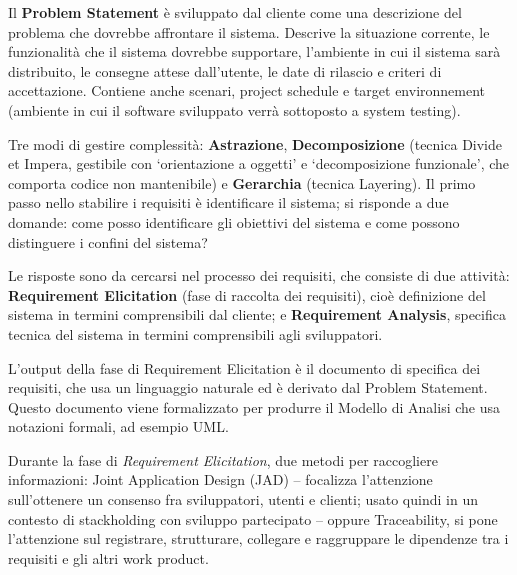 \documentclass{article}
\begin{document}
        Il \textbf{Problem Statement} è sviluppato dal cliente come una descrizione del problema che dovrebbe affrontare il sistema. Descrive la situazione corrente, le funzionalità che il sistema dovrebbe supportare, l’ambiente in cui il sistema sarà distribuito, le consegne attese dall’utente, le date di rilascio e criteri di accettazione. Contiene anche scenari, project schedule e target environnement (ambiente in cui il software sviluppato verrà sottoposto a system testing).

        \vspace{3mm}

        Tre modi di gestire complessità: \textbf{Astrazione}, \textbf{Decomposizione} (tecnica Divide et Impera, gestibile con ‘orientazione a oggetti’ e ‘decomposizione funzionale’, che comporta codice non mantenibile) e \textbf{Gerarchia} (tecnica Layering). Il primo passo nello stabilire i requisiti è identificare il sistema; si risponde a due domande: come posso identificare gli obiettivi del sistema e come possono distinguere i confini del sistema? 
        
        \vspace{3mm}
        
        Le risposte sono da cercarsi nel processo dei requisiti, che consiste di due attività: \textbf{Requirement Elicitation} (fase di raccolta dei requisiti), cioè definizione del sistema in termini comprensibili dal cliente; e \textbf{Requirement Analysis}, specifica tecnica del sistema in termini comprensibili agli sviluppatori.
        
        \vspace{3mm}
        
        L’output della fase di Requirement Elicitation è il documento di specifica dei requisiti, che usa un linguaggio naturale ed è derivato dal Problem Statement. Questo documento viene formalizzato per produrre il Modello di Analisi che usa notazioni formali, ad esempio UML. 

        \vspace{3mm}

        Durante la fase di \textit{Requirement Elicitation}, due metodi per raccogliere informazioni: Joint Application Design (JAD) – focalizza l’attenzione sull’ottenere un consenso fra sviluppatori, utenti e clienti; usato quindi in un contesto di stackholding con sviluppo partecipato – oppure Traceability, si pone l’attenzione sul registrare, strutturare, collegare e raggruppare le dipendenze tra i requisiti e gli altri work product. 
        
\end{document}
